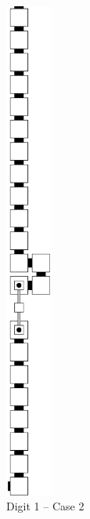 \begin{itemize}
\begin{figure}[H]
\begin{subfigure}[t]{0.17\textwidth}
                \includegraphics[width=0.17\textwidth]{warping/post_warp_case2_digit1_msr}
                \caption{\label{fig:post_warp_case2_digit1_msr} Digit 1 -- Case 2}
            \end{subfigure}%
            ~
            \begin{subfigure}[t]{0.17\textwidth}
                \centering

\end{subfigure}
\end{figure}
\end{itemize}
